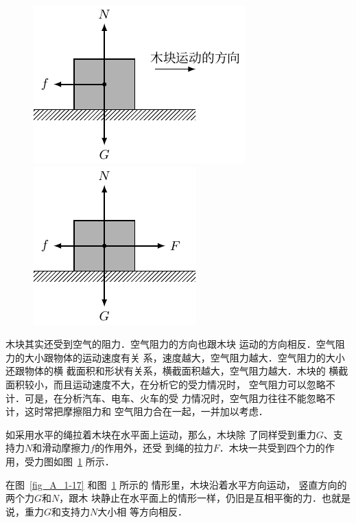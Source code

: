 \begin{figure} [htp]\centering
	\begin{minipage} [t]{0.48\textwidth} 
		\centering
		\includegraphics{fig/A/1-17.pdf} 
		\caption{} \label{fig_A_1-17} 
	\end{minipage} 
	\begin{minipage} [t]{0.48\textwidth} 
		\centering
		\includegraphics{fig/A/1-18.pdf} 
		\caption{} \label{fig_A_1-18} 
	\end{minipage} 
\end{figure} 

    木块其实还受到空气的阻力．空气阻力的方向也跟木块
运动的方向相反．空气阻力的大小跟物体的运动速度有关
系，速度越大，空气阻力越大．空气阻力的大小还跟物体的横
截面积和形状有关系，横截面积越大，空气阻力越大．木块的
横截面积较小，而且运动速度不大，在分析它的受力情况时，
空气阻力可以忽略不计．可是，在分析汽车、电车、火车的受
力情况时，空气阻力往往不能忽略不计，这时常把摩擦阻力和
空气阻力合在一起，一并加以考虑．

    如采用水平的绳拉着木块在水平面上运动，那么，木块除
了同样受到重力$G$、支持力$N$和滑动摩擦力$f$的作用外，还受
到绳的拉力$F$．木块一共受到四个力的作用，受力图如图~\ref{fig_A_1-18} 所示．

    在图~\ref{fig_A_1-17} 和图~\ref{fig_A_1-18} 所示的
情形里，木块沿着水平方向运动，
竖直方向的两个力$G$和$N$，跟木
块静止在水平面上的情形一样，仍旧是互相平衡的力．也就是说，重力$G$和支持力$N$大小相
等方向相反．


